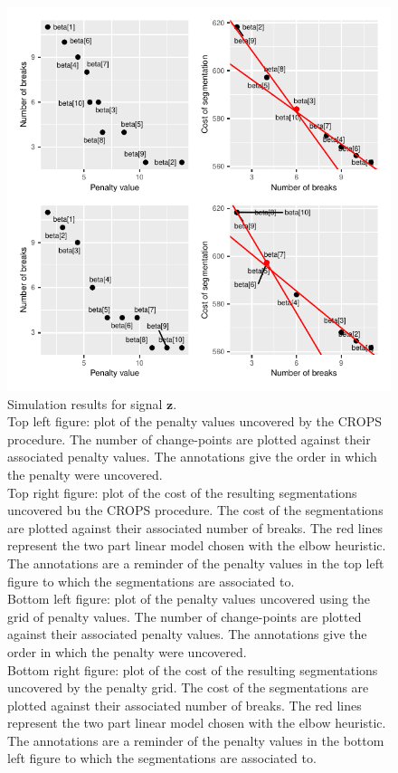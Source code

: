 \begin{figure}[htbp]
    \centering
    \includegraphics{figs/Chap4/RES_SIM_Z.pdf}
    \caption{Simulation results for signal $\bm z$. \\ 
    Top left figure: plot of the penalty values uncovered by the CROPS procedure. The number of change-points are plotted against their associated penalty values. The annotations give the order in which the penalty were uncovered. \\
    Top right figure: plot of the cost of the resulting segmentations uncovered bu the CROPS procedure. The cost of the segmentations are plotted against their associated number of breaks. The red lines represent the two part linear model chosen with the elbow heuristic. The annotations are a reminder of the penalty values in the top left figure to which the segmentations are associated to. \\
    Bottom left figure: plot of the penalty values uncovered using the grid of penalty values. The number of change-points are plotted against their associated penalty values. The annotations give the order in which the penalty were uncovered. \\
    Bottom right figure: plot of the cost of the resulting segmentations uncovered by the penalty grid. The cost of the segmentations are plotted against their associated number of breaks. The red lines represent the two part linear model chosen with the elbow heuristic. The annotations are a reminder of the penalty values in the bottom left figure to which the segmentations are associated to.}
    \label{fig:res_sim_z}
\end{figure}

